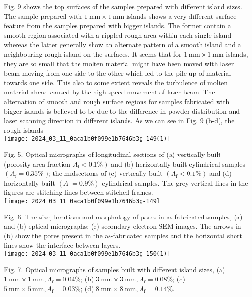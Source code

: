 \documentclass[10pt]{article}
\begin{document}
Fig. 9 shows the top surfaces of the samples prepared with different island sizes. The sample prepared with $1 \mathrm{~mm} \times 1 \mathrm{~mm}$ islands shows a very different surface feature from the samples prepared with bigger islands. The former contain a smooth region associated with a rippled rough area within each single island whereas the latter generally show an alternate pattern of a smooth island and a neighbouring rough island on the surfaces. It seems that for $1 \mathrm{~mm} \times 1 \mathrm{~mm}$ islands, they are so small that the molten material might have been moved with laser beam moving from one side to the other which led to the pile-up of material towards one side. This also to some extent reveals the turbulence of molten material ahead caused by the high speed movement of laser beam. The alternation of smooth and rough surface regions for samples fabricated with bigger islands is believed to be due to the difference in powder distribution and laser scanning direction in different islands. As we can see in Fig. 9 (b-d), the rough islands\\
\texttt{[image: 2024\_03\_11\_0aca1b0f099e1b7646b3g-149(1)]}

Fig. 5. Optical micrographs of longitudinal sections of (a) vertically built (porosity area fraction $\left.A_{\mathrm{f}}<0.1 \%\right)$ and (b) horizontally built cylindrical samples $\left(A_{\mathrm{f}}=0.35 \%\right.$ ); the midsections of (c) vertically built $\left(A_{\mathrm{f}}<0.1 \%\right)$ and (d) horizontally built $\left(A_{\mathrm{f}}=0.9 \%\right)$ cylindrical samples. The grey vertical lines in the figures are stitching lines between stitched frames.\\
\texttt{[image: 2024\_03\_11\_0aca1b0f099e1b7646b3g-149]}

Fig. 6. The size, locations and morphology of pores in as-fabricated samples, (a) and (b) optical micrographs; (c) secondary electron SEM images. The arrows in (b) show the pores present in the as-fabricated samples and the horizontal short lines show the interface between layers.\\
\texttt{[image: 2024\_03\_11\_0aca1b0f099e1b7646b3g-150(1)]}

Fig. 7. Optical micrographs of samples built with different island sizes, (a) $1 \mathrm{~mm} \times 1 \mathrm{~mm}, A_{\mathrm{f}}=0.04 \%$; (b) $3 \mathrm{~mm} \times 3 \mathrm{~mm}, A_{\mathrm{f}}=0.08 \%$; (c) $5 \mathrm{~mm} \times 5 \mathrm{~mm}, A_{\mathrm{f}}=0.03 \%$; (d) $8 \mathrm{~mm} \times 8 \mathrm{~mm}, A_{\mathrm{f}}=0.14 \%$.
\end{document}
